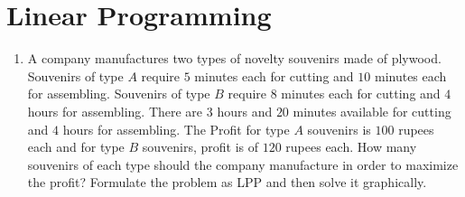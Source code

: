 \documentclass[12pt,-letter paper]{article}
\begin{document}
\section{Linear Programming}
\begin{enumerate}

\item A company manufactures two types of novelty souvenirs made of plywood. Souvenirs of type $A$ require $5$ minutes each for cutting and $10$ minutes each for assembling. Souvenirs of type $B$ require $8$ minutes each for cutting and $4$ hours for assembling. There are $3$ hours and $20$ minutes available for cutting and $4$ hours for assembling. The Profit for type $A$ souvenirs is $100$ rupees each and for type $B$ souvenirs, profit is of $120$ rupees each. How many souvenirs of each type should the company manufacture in order to maximize the profit? Formulate the problem as LPP and then solve it graphically.

\end{enumerate}      
\end{document}
